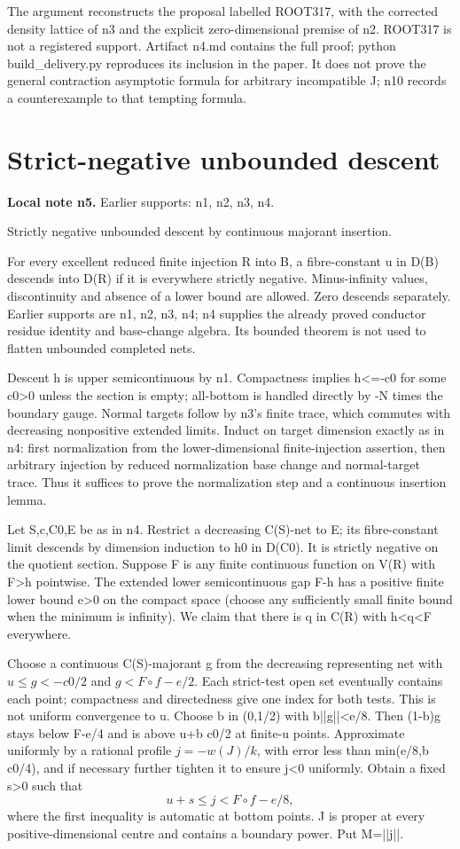 \documentclass[11pt]{article}
\begin{document}
The argument reconstructs the proposal labelled ROOT317, with the corrected density lattice of n3 and the explicit zero-dimensional premise of n2. ROOT317 is not a registered support. Artifact n4.md contains the full proof; python build\_delivery.py reproduces its inclusion in the paper. It does not prove the general contraction asymptotic formula for arbitrary incompatible J; n10 records a counterexample to that tempting formula.


\section{Strict-negative unbounded descent}
\label{sec:n5}
\noindent\textbf{Local note n5.} Earlier supports: n1, n2, n3, n4.

Strictly negative unbounded descent by continuous majorant insertion.

For every excellent reduced finite injection R into B, a fibre-constant u in D(B) descends into D(R) if it is everywhere strictly negative. Minus-infinity values, discontinuity and absence of a lower bound are allowed. Zero descends separately. Earlier supports are n1, n2, n3, n4; n4 supplies the already proved conductor residue identity and base-change algebra. Its bounded theorem is not used to flatten unbounded completed nets.

Descent h is upper semicontinuous by n1. Compactness implies h<=-c0 for some c0>0 unless the section is empty; all-bottom is handled directly by -N times the boundary gauge. Normal targets follow by n3's finite trace, which commutes with decreasing nonpositive extended limits. Induct on target dimension exactly as in n4: first normalization from the lower-dimensional finite-injection assertion, then arbitrary injection by reduced normalization base change and normal-target trace. Thus it suffices to prove the normalization step and a continuous insertion lemma.

Let S,c,C0,E be as in n4. Restrict a decreasing C(S)-net to E; its fibre-constant limit descends by dimension induction to h0 in D(C0). It is strictly negative on the quotient section. Suppose F is any finite continuous function on V(R) with F>h pointwise. The extended lower semicontinuous gap F-h has a positive finite lower bound e>0 on the compact space (choose any sufficiently small finite bound when the minimum is infinity). We claim that there is q in C(R) with h<q<F everywhere.

Choose a continuous C(S)-majorant g from the decreasing representing net with \(u\le g<-c0/2\) and \(g<F\circ f-e/2\). Each strict-test open set eventually contains each point; compactness and directedness give one index for both tests. This is not uniform convergence to u. Choose b in (0,1/2) with b||g||<e/8. Then (1-b)g stays below F-e/4 and is above u+b c0/2 at finite-u points. Approximate uniformly by a rational profile \(j=-w(J)/k\), with error less than min(e/8,b c0/4), and if necessary further tighten it to ensure j<0 uniformly. Obtain a fixed s>0 such that
\[
 u+s\le j<F\circ f-e/8,
\]
where the first inequality is automatic at bottom points. J is proper at every positive-dimensional centre and contains a boundary power. Put M=||j||.
\end{document}
